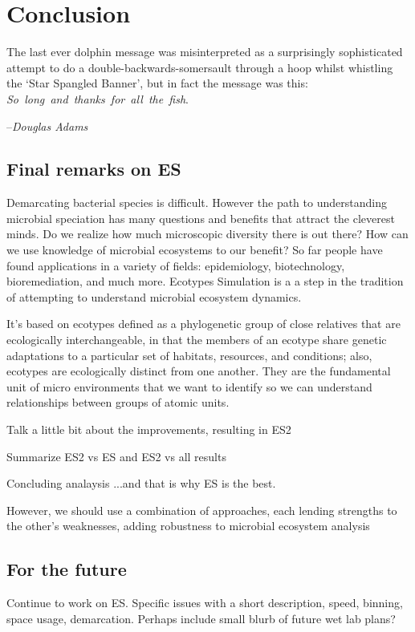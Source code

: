 \gobbletocpage
\chapter{Conclusion}
\restoretocpage

\begin{shadequote}
The last ever dolphin message was misinterpreted as a surprisingly sophisticated attempt to do a double-backwards-somersault through a hoop whilst whistling the `Star Spangled Banner', but in fact the message was this: \mbox{\emph{So long and thanks for all the fish}}. \par--\emph{Douglas Adams}
\end{shadequote}


\section{Final remarks on ES}

Demarcating bacterial species is difficult.
However the path to understanding microbial speciation has many questions and benefits that attract the cleverest minds.
Do we realize how much microscopic diversity there is out there?
How can we use knowledge of microbial ecosystems to our benefit?
So far people have found applications in a variety of fields: epidemiology, biotechnology, bioremediation, and much more.
Ecotypes Simulation is a a step in the tradition of attempting to understand microbial ecosystem dynamics.

It's based on ecotypes defined as a phylogenetic group of close relatives that are ecologically interchangeable, in that the members of an ecotype share genetic adaptations to a particular set of habitats, resources, and conditions; also, ecotypes are ecologically distinct from one another.
They are the fundamental unit of micro environments that we want to identify so we can understand relationships between groups of atomic units.

Talk a little bit about the improvements, resulting in ES2

Summarize ES2 vs ES and ES2 vs all results

Concluding analaysis
...and that is why ES is the best.

However, we should use a combination of approaches, each lending strengths to the other's weaknesses, adding robustness to microbial ecosystem analysis~\cite{bohannan2003new}

\section{For the future}
Continue to work on ES.
Specific issues with a short description, speed, binning, space usage, demarcation.
Perhaps include small blurb of future wet lab plans?